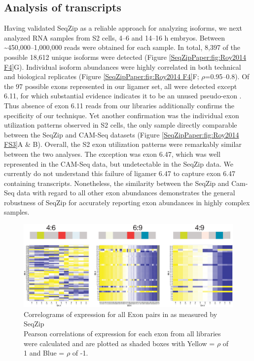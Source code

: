 	\subsection{Analysis of \dscam{} transcripts}\label{SeqZipPaper:subsec:SeqZip of endogenous Dscam}
	
		Having validated SeqZip as a reliable approach for analyzing \dscam{} isoforms, we next analyzed RNA samples from S2 cells, 4–6 and 14–16 h embryos. Between \textasciitilde 450,000–1,000,000 reads were obtained for each sample. In total, 8,397 of the possible 18,612 unique isoforms were detected (Figure \ref{SeqZipPaper:fig:Roy2014 F4}G). Individual isoform abundances were highly correlated in both technical and biological replicates (Figure \ref{SeqZipPaper:fig:Roy2014 F4}F; $\rho$=0.95–0.8). Of the 97 possible exons represented in our ligamer set, all were detected except 6.11, for which substantial evidence indicates it to be an unused pseudo-exon \citep{Neves2004,Zhan2004,Watson2005,Sun2013}. Thus absence of exon 6.11 reads from our libraries additionally confirms the specificity of our technique. Yet another confirmation was the individual exon utilization patterns observed in S2 cells, the only sample directly comparable between the SeqZip and CAM-Seq datasets (Figure \ref{SeqZipPaper:fig:Roy2014 FS3}A \& B). Overall, the S2 exon utilization patterns were remarkably similar between the two analyses. The exception was exon 6.47, which was well represented in the CAM-Seq data, but undetectable in the SeqZip data. We currently do not understand this failure of ligamer 6.47 to capture exon 6.47 containing transcripts. Nonetheless, the similarity between the SeqZip and Cam-Seq data with regard to all other exon abundances demonstrates the general robustness of SeqZip for accurately reporting exon abundances in highly complex samples.

		\begin{figure} %
		  \centering 
		  \includegraphics{Figures/SeqZipPaper/Roy2014FigS4.eps}
		  \caption[Roy et al 2014 Figure S4]
		  {Correlograms of expression for all Exon pairs in \dscam{} as measured by SeqZip\\[0.25cm]
		    Pearson correlations of expression for each exon from all libraries were calculated and are plotted as shaded boxes with Yellow = $\rho$ of 1 and Blue = $\rho$ of -1.
		    }
		  \label{SeqZipPaper:fig:Roy2014 FS4}
		  \end{figure}

